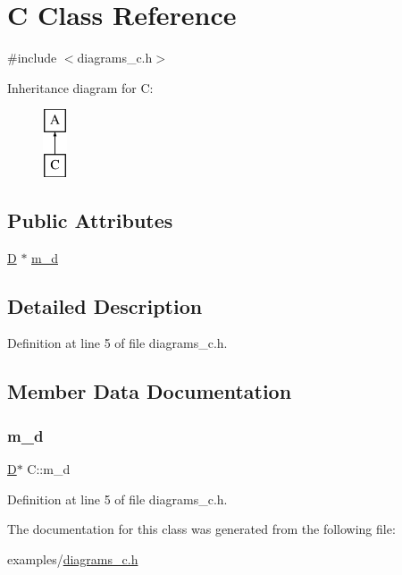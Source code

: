 \hypertarget{class_c}{}\section{C Class Reference}
\label{class_c}


{\ttfamily \#include $<$diagrams\+\_\+c.\+h$>$}

Inheritance diagram for C\+:\begin{figure}[H]
\begin{center}
\leavevmode
\includegraphics[height=2.000000cm]{class_c}
\end{center}
\end{figure}
\subsection*{Public Attributes}
\begin{DoxyCompactItemize}
\item 
\mbox{\hyperlink{class_d}{D}} $\ast$ \mbox{\hyperlink{class_c_a4ef972d28b73ff78eba3ab4f54c3b449}{m\+\_\+d}}
\end{DoxyCompactItemize}


\subsection{Detailed Description}


Definition at line 5 of file diagrams\+\_\+c.\+h.



\subsection{Member Data Documentation}
\mbox{\label{class_c_a4ef972d28b73ff78eba3ab4f54c3b449}} 
\subsubsection{\texorpdfstring{m\_d}{m\_d}}
{\footnotesize\ttfamily \mbox{\hyperlink{class_d}{D}}$\ast$ C\+::m\+\_\+d}



Definition at line 5 of file diagrams\+\_\+c.\+h.



The documentation for this class was generated from the following file\+:\begin{DoxyCompactItemize}
\item 
examples/\mbox{\hyperlink{diagrams__c_8h}{diagrams\+\_\+c.\+h}}\end{DoxyCompactItemize}

